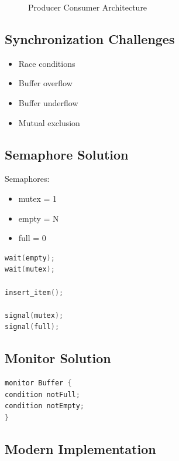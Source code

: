 \begin{figure}[H]
\centering
{}
\caption{Producer Consumer Architecture}
\end{figure}

\subsection{Synchronization Challenges}

\begin{itemize}
\item Race conditions
\item Buffer overflow
\item Buffer underflow
\item Mutual exclusion
\end{itemize}

\subsection{Semaphore Solution}

Semaphores:

\begin{itemize}
\item mutex = 1
\item empty = N
\item full = 0
\end{itemize}

\begin{lstlisting}[language=C,style=interviewcode]
wait(empty);
wait(mutex);

insert_item();

signal(mutex);
signal(full);
\end{lstlisting}

\subsection{Monitor Solution}

\begin{lstlisting}[language=C++,style=interviewcode]
monitor Buffer {
condition notFull;
condition notEmpty;
}
\end{lstlisting}

\subsection{Modern Implementation}

